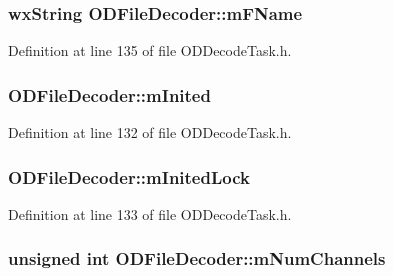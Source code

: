\subsubsection[{\texorpdfstring{m\+F\+Name}{mFName}}]{\setlength{\rightskip}{0pt plus 5cm}wx\+String O\+D\+File\+Decoder\+::m\+F\+Name\hspace{0.3cm}{\ttfamily [protected]}}\hypertarget{class_o_d_file_decoder_a05466f618761fa4bcdb7c3db42df9d9e}{}\label{class_o_d_file_decoder_a05466f618761fa4bcdb7c3db42df9d9e}


Definition at line 135 of file O\+D\+Decode\+Task.\+h.

\subsubsection[{\texorpdfstring{m\+Inited}{mInited}}]{ O\+D\+File\+Decoder\+::m\+Inited\hspace{0.3cm}{\ttfamily [protected]}}\hypertarget{class_o_d_file_decoder_a5b1f8a79d3e820ae550fd56ae2492b0e}{}\label{class_o_d_file_decoder_a5b1f8a79d3e820ae550fd56ae2492b0e}


Definition at line 132 of file O\+D\+Decode\+Task.\+h.

\subsubsection[{\texorpdfstring{m\+Inited\+Lock}{mInitedLock}}]{ O\+D\+File\+Decoder\+::m\+Inited\+Lock\hspace{0.3cm}{\ttfamily [protected]}}\hypertarget{class_o_d_file_decoder_a37da548db4b725cfa4d3d4edea169f5e}{}\label{class_o_d_file_decoder_a37da548db4b725cfa4d3d4edea169f5e}


Definition at line 133 of file O\+D\+Decode\+Task.\+h.

\subsubsection[{\texorpdfstring{m\+Num\+Channels}{mNumChannels}}]{\setlength{\rightskip}{0pt plus 5cm}unsigned {\bf int} O\+D\+File\+Decoder\+::m\+Num\+Channels\hspace{0.3cm}{\ttfamily [protected]}}\hypertarget{class_o_d_file_decoder_afb494af021ae7c734889addabba39420}{}\label{class_o_d_file_decoder_afb494af021ae7c734889addabba39420}


